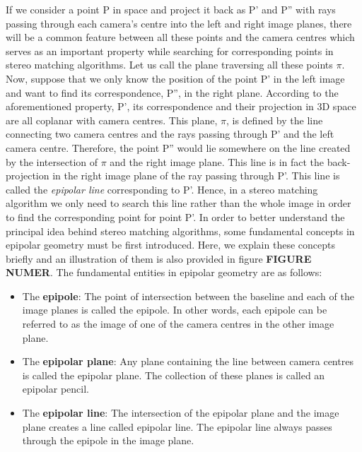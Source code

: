 \documentclass[dvips,letterpaper,12pt]{report}
\begin{document}
If we consider a point P in space and project it back as P' and P'' with rays passing through each camera's centre
into the left and right image planes, there will be a common feature between all these points and the camera centres which serves as an important property while searching for corresponding points
in stereo matching algorithms. Let us call the plane traversing all these points $\pi$.
Now, suppose that we only know the position of the point P' in the left image and want to find its correspondence, P'', in the right plane. According to the aforementioned property, P',
its correspondence and their projection in 3D space are all coplanar with camera centres. This plane, $\pi$, is defined by the line connecting two camera centres and 
the rays passing through P' and the left camera centre. Therefore, the point P'' would lie somewhere on the line created by the intersection of $\pi$ and the right image plane.
This line is in fact the back-projection in the right image plane of the ray passing through P'. This line is called the {\it epipolar line} corresponding to P'. Hence, in a stereo matching algorithm
we only need to search this line rather than the whole image in order to find the corresponding point for point P'.
In order to better understand the principal idea behind stereo matching algorithms, some fundamental concepts in epipolar geometry must be first introduced. 
Here, we explain these concepts briefly and an illustration of them is also provided in figure \textbf{FIGURE NUMER}.
\newline
The fundamental entities in epipolar geometry are as follows: \cite{hart2000}
\begin{itemize}
\item The \textbf{epipole}: The point of intersection between the baseline and each of the image planes is called the epipole. In other words, each epipole can be referred to as the image of one of
the camera centres in the other image plane.

\item The \textbf{epipolar plane}: Any plane containing the line between camera centres is called the epipolar plane. The collection of these planes is called an epipolar pencil. 

\item The \textbf{epipolar line}: The intersection of the epipolar plane and the image plane creates a line called epipolar line. The epipolar line always passes through the epipole in the 
image plane.
\end{itemize}
\end{document}
